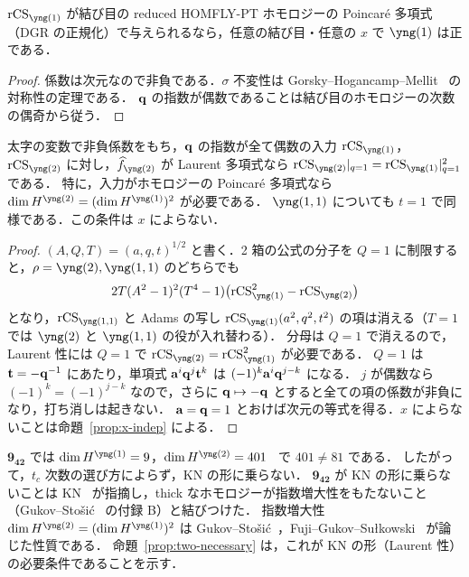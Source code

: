 \begin{corollary}\label{cor:one}
$\rCS_{\yng(1)}$ が結び目の reduced HOMFLY-PT ホモロジーの Poincaré 多項式（DGR の正規化）で与えられるなら，任意の結び目・任意の $x$ で $\yng(1)$ は正である．
\end{corollary}
\begin{proof}
係数は次元なので非負である．$\sigma$ 不変性は Gorsky--Hogancamp--Mellit~\cite{Gorsky21} の対称性の定理である．
$\mathbf{q}$ の指数が偶数であることは結び目のホモロジーの次数の偶奇から従う．
\end{proof}

\begin{proposition}\label{prop:two-necessary}
太字の変数で非負係数をもち，$\mathbf{q}$ の指数が全て偶数の入力 $\rCS_{\yng(1)}$，$\rCS_{\yng(2)}$ に対し，$\hf_{\yng(2)}$ が Laurent 多項式なら $\rCS_{\yng(2)}|_{q=1}=\rCS_{\yng(1)}|_{q=1}^2$ である．
特に，入力がホモロジーの Poincaré 多項式なら $\dim H^{\yng(2)}=(\dim H^{\yng(1)})^2$ が必要である．
$\yng(1,1)$ についても $t=1$ で同様である．この条件は $x$ によらない．
\end{proposition}
\begin{proof}
$(A,Q,T)=(a,q,t)^{1/2}$ と書く．2 箱の公式の分子を $Q=1$ に制限すると，$\rho=\yng(2),\yng(1,1)$ のどちらでも
\[
2T(A^2-1)^2(T^4-1)\bigl(\rCS_{\yng(1)}^2-\rCS_{\yng(2)}\bigr)
\]
となり，$\rCS_{\yng(1,1)}$ と Adams の写し $\rCS_{\yng(1)}(a^2,q^2,t^2)$ の項は消える（$T=1$ では $\yng(2)$ と $\yng(1,1)$ の役が入れ替わる）．
分母は $Q=1$ で消えるので，Laurent 性には $Q=1$ で $\rCS_{\yng(2)}=\rCS_{\yng(1)}^2$ が必要である．
$Q=1$ は $\mathbf{t}=-\mathbf{q}^{-1}$ にあたり，単項式 $\mathbf{a}^i\mathbf{q}^j\mathbf{t}^k$ は $(-1)^k\mathbf{a}^i\mathbf{q}^{j-k}$ になる．
$j$ が偶数なら $(-1)^k=(-1)^{j-k}$ なので，さらに $\mathbf{q}\mapsto-\mathbf{q}$ とすると全ての項の係数が非負になり，打ち消しは起きない．
$\mathbf{a}=\mathbf{q}=1$ とおけば次元の等式を得る．$x$ によらないことは命題~\ref{prop:x-indep} による．
\end{proof}

\begin{remark}
$\mathbf{9_{42}}$ では $\dim H^{\yng(1)}=9$，$\dim H^{\yng(2)}=401$~\cite{Gorsky13} で $401\neq81$ である．
したがって，$t_c$ 次数の選び方によらず，KN の形に乗らない．
$\mathbf{9_{42}}$ が KN の形に乗らないことは KN~\cite{Kameyama17} が指摘し，thick なホモロジーが指数増大性をもたないこと（Gukov--Stošić~\cite{Gukov11} の付録 B）と結びつけた．
指数増大性 $\dim H^{\yng(2)}=(\dim H^{\yng(1)})^2$ は Gukov--Stošić~\cite{Gukov11}，Fuji--Gukov--Sułkowski~\cite{Fuji12} が論じた性質である．
命題~\ref{prop:two-necessary} は，これが KN の形（Laurent 性）の必要条件であることを示す．
\end{remark}

